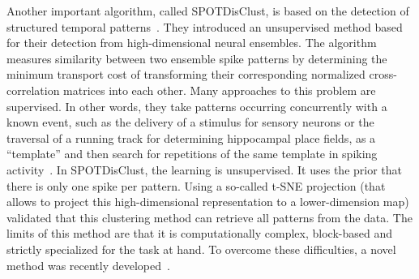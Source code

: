 \documentclass[brainsci, %
               review,submit,pdftex,moreauthors
               ]{Definitions/mdpi}
\begin{document}
Another important algorithm, called SPOTDisClust, is based on the detection of structured temporal patterns~\citep{grossberger_unsupervised_2018}. They introduced an unsupervised method based for their detection from high-dimensional neural ensembles. The algorithm measures similarity between two ensemble spike patterns by determining the minimum transport cost of transforming their corresponding normalized cross-correlation matrices into each other. Many approaches to this problem are supervised. In other words, they take patterns occurring concurrently with a known event, such as the delivery of a stimulus for sensory neurons or the traversal of a running track for determining hippocampal place fields, as a ``template'' and then search for repetitions of the same template in spiking activity~\citep{nadasdy_replay_1999,lee_combinatorial_2004}. In SPOTDisClust, the learning is unsupervised. It uses the prior that there is only one spike per pattern. Using a so-called t-SNE projection (that allows to project this high-dimensional representation to a lower-dimension map) validated that this clustering method can retrieve all patterns from the data. %
The limits of this method are that it is computationally complex, block-based and strictly specialized for the task at hand. To overcome these difficulties, a novel method was recently developed~\citep{sotomayor-gomez_spikeship_2021}.


%
\end{document}
